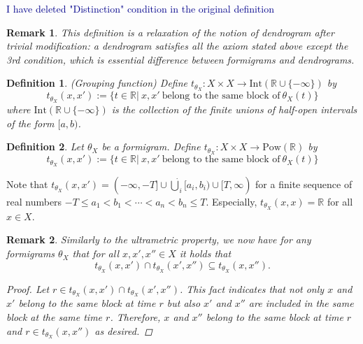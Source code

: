 \documentclass[a4paper,12pt]{article}
\newtheorem{remark}{Remark}[section]
\newtheorem{definition}{Definition}[section]
\newcommand{\woojin}[1]           {{ \textcolor{darkblue} {#1}}}
\begin{document}
\woojin{I have deleted "Distinction" condition in the original definition}

\begin{remark} This definition is a relaxation of the notion of dendrogram after trivial modification: a dendrogram satisfies all the axiom stated above except the 3rd condition, which is essential difference between formigrams and dendrograms. 

\end{remark}



\begin{definition}(Grouping function) Define $t_{\theta_X}:X\times X \rightarrow \mathrm{Int}(\mathbb{R}\cup \{-\infty\})$ by 
$$t_{\theta_X}(x,x'):=\{t\in \mathbb{R}|\ x, x'\ \mbox{belong to the same block of}\ \theta_{X}(t)\}$$
where $\mathrm{Int}(\mathbb{R}\cup \{-\infty\})$ is the collection of the finite unions of half-open intervals of the form $[a,b)$.
\end{definition}

\begin{definition} Let $\theta_X$ be a formigram.  Define $t_{\theta_X}:X\times X \rightarrow \mathrm{Pow}(\mathbb{R})$ by 
$$t_{\theta_X}(x,x'):=\{t\in \mathbb{R}|\ x, x'\ \mbox{belong to the same block of}\ \theta_{X}(t)\}$$
\end{definition}
Note that $t_{\theta_{X}}(x,x')=(-\infty, -T]\cup \dot{\bigcup}_i{[a_i, b_i)} \cup [T, \infty)$ for a finite sequence of real numbers $-T \leq a_1<b_1<\cdots<a_n<b_n\leq T$. Especially, $t_{\theta_X}(x,x)=\mathbb{R}$ for all $x\in X$.

\begin{remark}
Similarly to the ultrametric property, we now have for any formigrams $\theta_X$ that for all $x,x',x''\in X$ it holds that 
$$t_{\theta_X}(x,x')\cap t_{\theta_X}(x',x'')\subseteq t_{\theta_X}(x,x'').$$
\begin{proof}
Let $r\in t_{\theta_X}(x,x')\cap t_{\theta_X}(x',x'')$. This fact indicates that not only $x$ and $x'$ belong to the same block at time $r$ but  also $x'$ and $x''$ are included in the same block at the same time $r$. Therefore, $x$ and $x''$ belong to the same block at time $r$ and $r\in t_{\theta_X}(x,x'')$ as desired.
\end{proof}
\end{remark}
\end{document}
